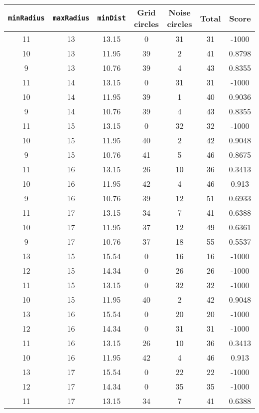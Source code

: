 \documentclass[letterpaper, 12pt]{article}
\begin{document}
\begin{longtable}{|c|c|c|c|c|c|c|}
\hline
\textbf{\texttt{minRadius}} & \textbf{\texttt{maxRadius}} & \textbf{\texttt{minDist}} & \textbf{Grid circles} & \textbf{Noise circles} & \textbf{Total} & \textbf{Score} \\
\hline
11 & 13 & 13.15 & 0 & 31 & 31 & -1000 \\
\hline
10 & 13 & 11.95 & 39 & 2 & 41 & 0.8798 \\
\hline
9 & 13 & 10.76 & 39 & 4 & 43 & 0.8355 \\
\hline
11 & 14 & 13.15 & 0 & 31 & 31 & -1000 \\
\hline
10 & 14 & 11.95 & 39 & 1 & 40 & 0.9036 \\
\hline
9 & 14 & 10.76 & 39 & 4 & 43 & 0.8355 \\
\hline
11 & 15 & 13.15 & 0 & 32 & 32 & -1000 \\
\hline
10 & 15 & 11.95 & 40 & 2 & 42 & 0.9048 \\
\hline
9 & 15 & 10.76 & 41 & 5 & 46 & 0.8675 \\
\hline
11 & 16 & 13.15 & 26 & 10 & 36 & 0.3413 \\
\hline
10 & 16 & 11.95 & 42 & 4 & 46 & 0.913 \\
\hline
9 & 16 & 10.76 & 39 & 12 & 51 & 0.6933 \\
\hline
11 & 17 & 13.15 & 34 & 7 & 41 & 0.6388 \\
\hline
10 & 17 & 11.95 & 37 & 12 & 49 & 0.6361 \\
\hline
9 & 17 & 10.76 & 37 & 18 & 55 & 0.5537 \\
\hline
13 & 15 & 15.54 & 0 & 16 & 16 & -1000 \\
\hline
12 & 15 & 14.34 & 0 & 26 & 26 & -1000 \\
\hline
11 & 15 & 13.15 & 0 & 32 & 32 & -1000 \\
\hline
10 & 15 & 11.95 & 40 & 2 & 42 & 0.9048 \\
\hline
13 & 16 & 15.54 & 0 & 20 & 20 & -1000 \\
\hline
12 & 16 & 14.34 & 0 & 31 & 31 & -1000 \\
\hline
11 & 16 & 13.15 & 26 & 10 & 36 & 0.3413 \\
\hline
10 & 16 & 11.95 & 42 & 4 & 46 & 0.913 \\
\hline
13 & 17 & 15.54 & 0 & 22 & 22 & -1000 \\
\hline
12 & 17 & 14.34 & 0 & 35 & 35 & -1000 \\
\hline
11 & 17 & 13.15 & 34 & 7 & 41 & 0.6388 \\
\hline

\end{longtable}
\end{document}
